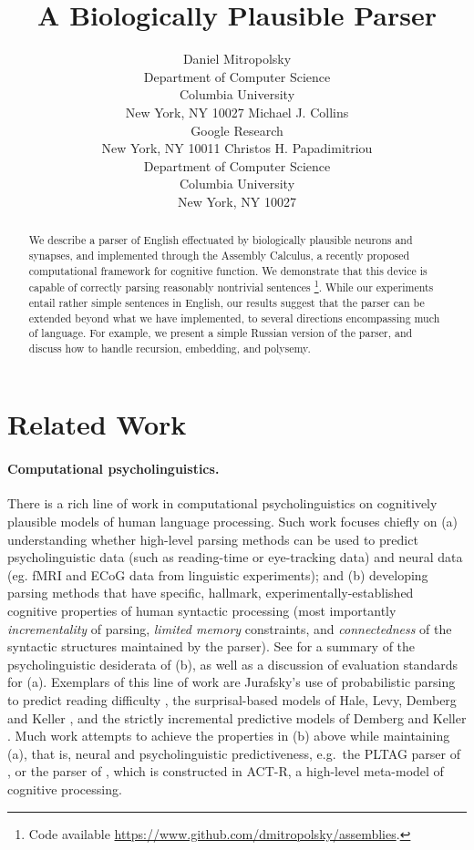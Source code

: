 \documentclass[11pt,a4paper]{article}
\title{A Biologically Plausible Parser}
\author{
 Daniel Mitropolsky \\ 
 Department of Computer Science \\
 Columbia University \\
 New York, NY 10027 \And
 Michael J. Collins \\
 Google Research \\
 New York, NY 10011 \And
 Christos H. Papadimitriou \\
 Department of Computer Science \\
 Columbia University \\
 New York, NY 10027
}
\date{}
\begin{document}
\maketitle
\begin{abstract}
We describe a parser of English effectuated by biologically plausible neurons and synapses, and implemented through the Assembly Calculus, a recently proposed computational framework for cognitive function.   We demonstrate that this device is capable of correctly parsing reasonably nontrivial sentences%
\footnote{Code available \url{https://www.github.com/dmitropolsky/assemblies}.}.  While our experiments entail rather simple sentences in English, our results suggest that the parser can be extended beyond what we have implemented, to several directions encompassing much of language. For example, we present a simple Russian version of the parser, and discuss how to handle recursion, embedding, and polysemy. 
\end{abstract}



\section{Related Work} \label{related}
\paragraph{Computational psycholinguistics.} There is a rich line of work in computational psycholinguistics on cognitively plausible models of human language processing. Such work focuses chiefly on (a) understanding whether high-level parsing methods can be used to predict psycholinguistic data (such as reading-time or eye-tracking data) and neural data (eg. fMRI and ECoG data from linguistic experiments); and (b) developing parsing methods that have specific, hallmark, experimentally-established cognitive properties of human syntactic processing (most importantly {\em incrementality} of parsing, {\em limited memory} constraints, and {\em connectedness} of the syntactic structures maintained by the parser). See \citet{keller-survey} for a summary of the psycholinguistic desiderata of (b), as well as a discussion of evaluation standards for (a). 
Exemplars of this line of work are Jurafsky’s use of probabilistic parsing to predict reading difficulty \cite{jurafsky}, the surprisal-based models of Hale, Levy, Demberg and Keller \cite{Hale2001, Levy2008, DembergKeller2008a}, and the strictly incremental predictive models of Demberg and Keller \cite{DembergKeller2008b, DembergKeller2009}.  Much work attempts to achieve the properties in (b) above while maintaining (a), that is, neural and psycholinguistic predictiveness, e.g.~the PLTAG parser of \citet{DembergPLTAG}, or the parser of  \citet{VasisthLewis}, which is constructed in ACT-R, a high-level meta-model of cognitive processing. 
\end{document}
